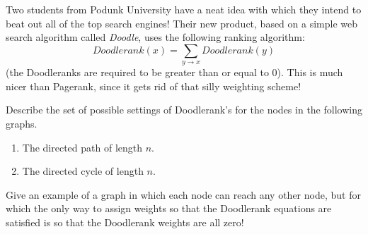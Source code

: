 \documentclass[12pt,twoside]{article}
\begin{document}

\begin{problem}{25}
Two students from Podunk University have a neat idea with which they
intend to beat out all of the top search engines! Their new product,
based on a simple web search algorithm called {\em Doodle},  uses
the following ranking algorithm:
$$Doodlerank(x) = \sum_{y \rightarrow x} Doodlerank(y)$$
(the Doodleranks are required to be greater than or equal to 0).
This is much nicer than Pagerank, since it gets rid of that silly
weighting scheme!

\bparts

Describe the set of possible settings of Doodlerank's for the
nodes in the following graphs.
\begin{enumerate}
\item The directed path of length $n$.


\item The directed cycle of length $n$.

\end{enumerate}

Give an example of a graph in which each node can reach any
other node, but for which the only way to assign weights so that the
Doodlerank equations are satisfied is so that the Doodlerank weights
are all zero!

\end{problem}
\end{document}
